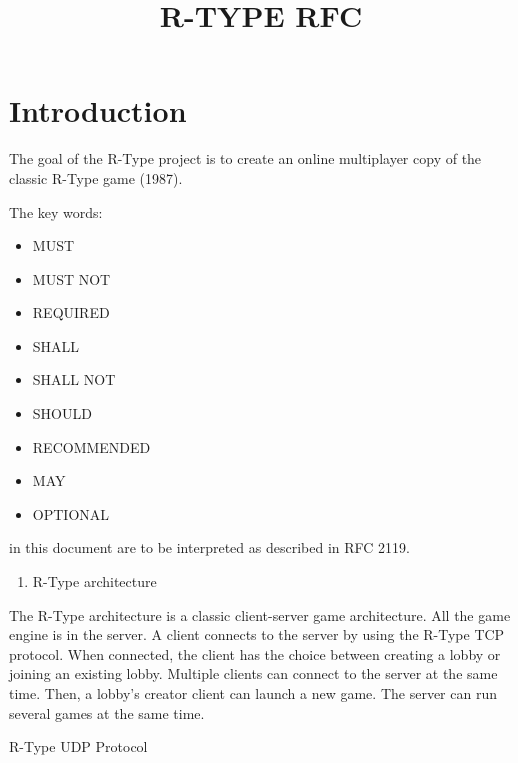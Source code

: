 \documentclass[12pt, letterpaper]{article}\title{R-TYPE RFC}
\begin{document}
\section{Introduction}
\vspace{5mm} %

The goal of the R-Type project is to create an online multiplayer copy
of the classic R-Type game (1987).

The key words:  
\begin{itemize}
    \item MUST
    \item MUST NOT
    \item REQUIRED
    \item SHALL
    \item SHALL NOT
    \item SHOULD
    \item RECOMMENDED
    \item MAY
    \item OPTIONAL
\end{itemize}

in this document are to be interpreted as described in RFC
2119.

\begin{enumerate}
\item
  R-Type architecture
\end{enumerate}

The R-Type architecture is a classic client-server game architecture.
All the game engine is in the server. A client connects to the server by
using the R-Type TCP protocol. When connected, the client has the choice
between creating a lobby or joining an existing lobby. Multiple clients
can connect to the server at the same time. Then, a lobby's creator
client can launch a new game. The server can run several games at the
same time.

R-Type UDP Protocol
\end{document}
